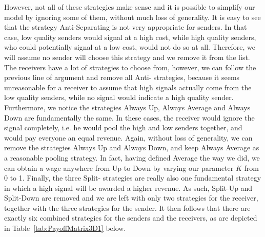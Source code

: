 \documentclass[a4paper,10pt]{article}
\numberwithin{equation}{section}
\begin{document}
However, not all of these strategies make sense and it is possible to simplify our model by ignoring some of them, without much loss of generality. It is easy to see that the strategy Anti-Separating is not very appropriate for senders. In that case, low quality senders would signal at a high cost, while high quality senders, who could potentially signal at a low cost, would not do so at all. Therefore, we will assume no sender will choose this strategy and we remove it from the list. The receivers have a lot of strategies to choose from, however, we can follow the previous line of argument and remove all Anti- strategies, because it seems unreasonable for a receiver to assume that high signals actually come from the low quality senders, while no signal would indicate a high quality sender. Furthermore, we notice the strategies Always Up, Always Average and Always Down are fundamentally the same. In these cases, the receiver would ignore the signal completely, i.e. he would pool the high and low senders together, and would pay everyone an equal revenue. Again, without loss of generality, we can remove the strategies Always Up and Always Down, and keep Always Average as a reasonable pooling strategy. In fact, having defined Average the way we did, we can obtain a wage anywhere from Up to Down by varying our parameter $K$ from 0 to 1. Finally, the three Split- strategies are really also one fundamental strategy in which a high signal will be awarded a higher revenue. As such, Split-Up and Split-Down are removed and we are left with only two strategies for the receiver, together with the three strategies for the sender. It then follows that there are exactly six combined strategies for the senders and the receivers, as are depicted in Table~\ref{tab:PayoffMatrix3D1} below.
\end{document}
